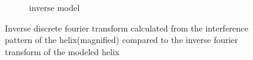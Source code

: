 \begin{figure}[H]
\begin{subfigure}{0.49\columnwidth}
        \caption{inverse model}
        \label{fig:helix inverse fourier}
    \end{subfigure}
    \caption{Inverse discrete fourier transform calculated from the interference pattern of the helix(magnified) compared to the inverse fourier transform of the modeled helix}
    \label{fig:expansion theory measurements}
\end{figure}

